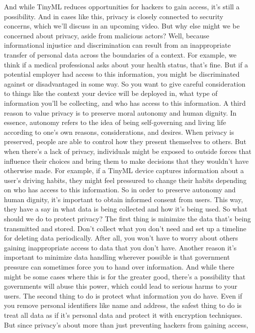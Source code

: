 And while TinyML reduces opportunities for hackers to gain access,
it's still a possibility.
And in cases like this, privacy is closely
connected to security concerns, which we'll discuss in an upcoming video.
But why else might we be concerned about privacy, aside from malicious actors?
Well, because informational injustice and discrimination
can result from an inappropriate transfer of personal data
across the boundaries of a context.
For example, we think if a medical professional asks
about your health status, that's fine.
But if a potential employer had access to this information,
you might be discriminated against or disadvantaged in some way.
So you want to give careful consideration
to things like the context your device will be deployed in,
what type of information you'll be collecting,
and who has access to this information.
A third reason to value privacy is to preserve
moral autonomy and human dignity.
In essence, autonomy refers to the idea of being self-governing and living life
according to one's own reasons, considerations, and desires.
When privacy is preserved, people are able to control
how they present themselves to others.
But when there's a lack of privacy, individuals
might be exposed to outside forces that influence their choices
and bring them to make decisions that they wouldn't have otherwise made.
For example, if a TinyML device captures information about a user's driving
habits, they might feel pressured to change their habits depending
on who has access to this information.
So in order to preserve autonomy and human dignity,
it's important to obtain informed consent from users.
This way, they have a say in what data is being collected
and how it's being used.
So what should we do to protect privacy?
The first thing is minimize the data that's being transmitted and stored.
Don't collect what you don't need and set up a timeline for deleting data
periodically.
After all, you won't have to worry about others gaining inappropriate access
to data that you don't have.
Another reason it's important to minimize data handling wherever
possible is that government pressure can sometimes
force you to hand over information.
And while there might be some cases where this is for the greater good,
there's a possibility that governments will
abuse this power, which could lead to serious harms to your users.
The second thing to do is protect what information you do have.
Even if you remove personal identifiers like name and address,
the safest thing to do is treat all data as if it's personal data
and protect it with encryption techniques.
But since privacy's about more than just preventing hackers from gaining access,
